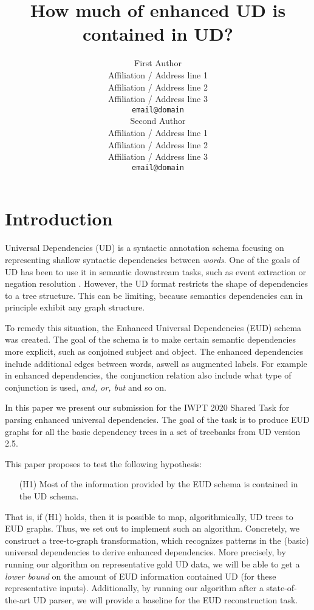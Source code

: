 \documentclass[11pt,a4paper]{article}
\title{How much of enhanced UD is contained in UD?}
\author{First Author \\
  Affiliation / Address line 1 \\
  Affiliation / Address line 2 \\
  Affiliation / Address line 3 \\
  \texttt{email@domain} \\\And
  Second Author \\
  Affiliation / Address line 1 \\
  Affiliation / Address line 2 \\
  Affiliation / Address line 3 \\
  \texttt{email@domain} \\}
\date{}
\begin{document}
\maketitle
\begin{abstract}
\end{abstract}

\section{Introduction}
Universal Dependencies (UD) is a syntactic annotation schema
focusing on representing shallow syntactic dependencies between
\emph{words}. One of the goals of UD has been to use it in
semantic downstream tasks, such as event extraction
\citep{fares20182018, mcclosky2011event} or
negation resolution \citep{fares20182018}.
%
However, the UD format restricts the shape of dependencies to a tree
structure.  This can be limiting, because semantics dependencies can
in principle exhibit any graph structure.

To remedy this situation, the Enhanced Universal
Dependencies (EUD) schema was created. The goal of the schema is
to make certain semantic dependencies more explicit, such as
conjoined subject and object. The enhanced dependencies include
additional edges between words, aswell as augmented labels. For
example in enhanced dependencies, the conjunction relation also
include what type of conjunction is used, \textit{and, or, but}
and so on.

In this paper we present our submission for the IWPT 2020 Shared
Task for parsing enhanced universal dependencies. The goal of the
task is to produce EUD graphs for all the basic dependency trees
in a set of treebanks from UD version 2.5.

This paper proposes to test the following hypothesis:
\begin{enumerate}
\item[(H1)] Most of the information provided by the EUD schema is
  contained in the UD schema.
\end{enumerate}

That is, if (H1) holds, then it is possible to map, algorithmically,
UD trees to EUD graphs.
%
Thus, we set out to implement such an algorithm. Concretely, we
construct a tree-to-graph transformation, which recognizes patterns in
the (basic) universal dependencies to derive enhanced dependencies.
%
More precisely, by running our algorithm on representative gold UD
data, we will be able to get a \emph{lower bound} on the amount of EUD
information contained UD (for these representative inputs).
%
Additionally, by running our algorithm after a state-of-the-art UD
parser, we will provide a baseline for the EUD reconstruction task.
\end{document}
